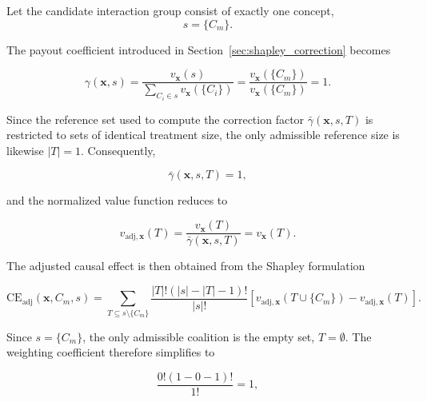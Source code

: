 \begin{math_box}[label=ma:one_item_group]
    Let the candidate interaction group consist of exactly one concept,
    \begin{equation}
        s=\{C_m\}.
    \end{equation}

    The payout coefficient introduced in Section~\ref{sec:shapley_correction} becomes

    \begin{equation}
        \gamma(\mathbf{x},s)
        =
        \frac{v_{\mathbf{x}}(s)}
        {\sum_{C_i\in s}v_{\mathbf{x}}(\{C_i\})}
        =
        \frac{v_{\mathbf{x}}(\{C_m\})}
        {v_{\mathbf{x}}(\{C_m\})}
        =1.
    \end{equation}

    Since the reference set used to compute the correction factor
    $\bar\gamma(\mathbf{x},s,T)$ is restricted to sets of identical treatment size,
    the only admissible reference size is likewise $|T|=1$. Consequently,

    \begin{equation}
        \bar\gamma(\mathbf{x},s,T)=1,
    \end{equation}

    and the normalized value function reduces to

    \begin{equation}
        v_{\mathrm{adj},\mathbf{x}}(T)
        =
        \frac{v_{\mathbf{x}}(T)}
        {\bar\gamma(\mathbf{x},s,T)}
        =
        v_{\mathbf{x}}(T).
    \end{equation}

    The adjusted causal effect is then obtained from the Shapley formulation

    \begin{equation}
        \mathrm{CE}_{\mathrm{adj}}(\mathbf{x},C_m,s)
        =
        \sum_{T\subseteq s\setminus\{C_m\}}
        \frac{|T|!(|s|-|T|-1)!}{|s|!}
        \left[
            v_{\mathrm{adj},\mathbf{x}}(T\cup\{C_m\})
            -
            v_{\mathrm{adj},\mathbf{x}}(T)
            \right].
    \end{equation}

    Since $s=\{C_m\}$, the only admissible coalition is the empty set,
    $T=\emptyset$. The weighting coefficient therefore simplifies to

    \begin{equation}
        \frac{0!(1-0-1)!}{1!}=1,
    \end{equation}


\end{math_box}
